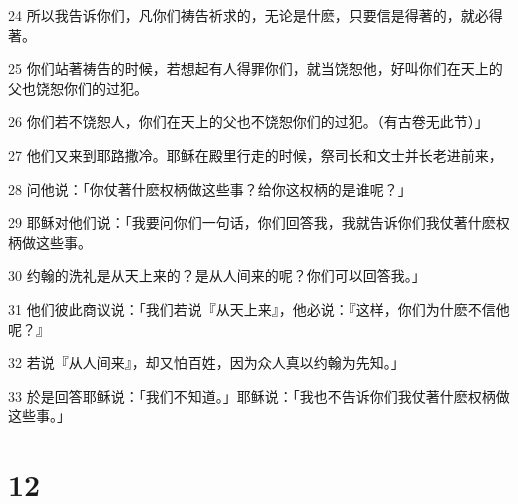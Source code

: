 \par 24 所以我告诉你们，凡你们祷告祈求的，无论是什麽，只要信是得著的，就必得著。
\par 25 你们站著祷告的时候，若想起有人得罪你们，就当饶恕他，好叫你们在天上的父也饶恕你们的过犯。
\par 26 你们若不饶恕人，你们在天上的父也不饶恕你们的过犯。（有古卷无此节）」
\par 27 他们又来到耶路撒冷。耶稣在殿里行走的时候，祭司长和文士并长老进前来，
\par 28 问他说：「你仗著什麽权柄做这些事？给你这权柄的是谁呢？」
\par 29 耶稣对他们说：「我要问你们一句话，你们回答我，我就告诉你们我仗著什麽权柄做这些事。
\par 30 约翰的洗礼是从天上来的？是从人间来的呢？你们可以回答我。」
\par 31 他们彼此商议说：「我们若说『从天上来』，他必说：『这样，你们为什麽不信他呢？』
\par 32 若说『从人间来』，却又怕百姓，因为众人真以约翰为先知。」
\par 33 於是回答耶稣说：「我们不知道。」耶稣说：「我也不告诉你们我仗著什麽权柄做这些事。」

\chapter{12}

